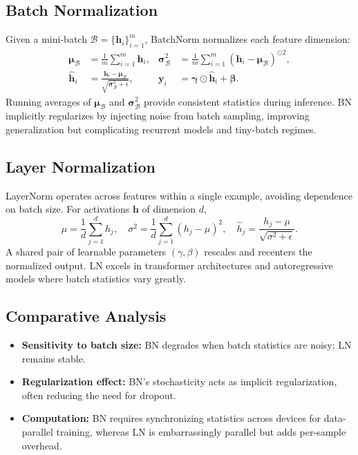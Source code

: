 \documentclass{article}
\begin{document}
\subsection{Batch Normalization}
Given a mini-batch $\mathcal{B} = \{\mathbf{h}_i\}_{i=1}^{m}$, BatchNorm normalizes each feature dimension:
\begin{align}
  \boldsymbol{\mu}_\mathcal{B} &= \frac{1}{m} \sum_{i=1}^{m} \mathbf{h}_i, &
  \boldsymbol{\sigma}_\mathcal{B}^2 &= \frac{1}{m} \sum_{i=1}^{m} (\mathbf{h}_i - \boldsymbol{\mu}_\mathcal{B})^{\odot 2}, \\
  \hat{\mathbf{h}}_i &= \frac{\mathbf{h}_i - \boldsymbol{\mu}_\mathcal{B}}{\sqrt{\boldsymbol{\sigma}_\mathcal{B}^2 + \epsilon}}, &
  \mathbf{y}_i &= \boldsymbol{\gamma} \odot \hat{\mathbf{h}}_i + \boldsymbol{\beta}.
\end{align}
Running averages of $\boldsymbol{\mu}_\mathcal{B}$ and $\boldsymbol{\sigma}_\mathcal{B}^2$ provide consistent statistics during inference. BN implicitly regularizes by injecting noise from batch sampling, improving generalization but complicating recurrent models and tiny-batch regimes.

\subsection{Layer Normalization}
LayerNorm operates across features within a single example, avoiding dependence on batch size. For activations $\mathbf{h}$ of dimension $d$,
\begin{equation}
  \mu = \frac{1}{d} \sum_{j=1}^{d} h_j, \quad \sigma^2 = \frac{1}{d} \sum_{j=1}^{d} (h_j - \mu)^2, \quad \hat{h}_j = \frac{h_j - \mu}{\sqrt{\sigma^2 + \epsilon}}.
\end{equation}
A shared pair of learnable parameters $(\gamma, \beta)$ rescales and recenters the normalized output. LN excels in transformer architectures and autoregressive models where batch statistics vary greatly.

\subsection{Comparative Analysis}
\begin{itemize}
  \item \textbf{Sensitivity to batch size:} BN degrades when batch statistics are noisy; LN remains stable.
  \item \textbf{Regularization effect:} BN's stochasticity acts as implicit regularization, often reducing the need for dropout.
  \item \textbf{Computation:} BN requires synchronizing statistics across devices for data-parallel training, whereas LN is embarrassingly parallel but adds per-sample overhead.
\end{itemize}
\end{document}
